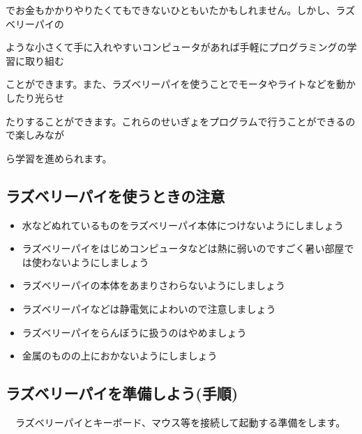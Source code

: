 \documentclass[a4paper,12pt]{jarticle}
\begin{document}
でお金もかかりやりたくてもできないひともいたかもしれません。しかし、ラズベリーパイの

ような小さくて手に入れやすいコンピュータがあれば手軽にプログラミングの学習に取り組む

ことができます。また、ラズベリーパイを使うことでモータやライトなどを動かしたり光らせ

たりすることができます。これらのせいぎょをプログラムで行うことができるので楽しみなが

ら学習を進められます。

\subsection{ラズベリーパイを使うときの注意}
\begin{itemize}
  \item
        水などぬれているものをラズベリーパイ本体につけないようにしましょう
\end{itemize}
\begin{itemize}
  \item
        ラズベリーパイをはじめコンピュータなどは熱に弱いのですごく暑い部屋では使わないようにしましょう
\end{itemize}
\begin{itemize}
  \item
        ラズベリーパイの本体をあまりさわらないようにしましょう
  \item
        ラズベリーパイなどは静電気によわいので注意しましょう
\end{itemize}
\begin{itemize}
  \item
        ラズベリーパイをらんぼうに扱うのはやめましょう
\end{itemize}
\begin{itemize}
  \item
        金属のものの上におかないようにしましょう
\end{itemize}

\clearpage

\subsection{ラズベリーパイを準備しよう(手順)}
\ \ ラズベリーパイとキーボード、マウス等を接続して起動する準備をします。
\end{document}
